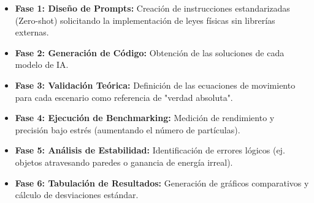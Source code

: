 \begin{itemize}
    \item \textbf{Fase 1: Diseño de Prompts:} Creación de instrucciones estandarizadas (Zero-shot) solicitando la implementación de leyes físicas sin librerías externas.
    \item \textbf{Fase 2: Generación de Código:} Obtención de las soluciones de cada modelo de IA.
    \item \textbf{Fase 3: Validación Teórica:} Definición de las ecuaciones de movimiento para cada escenario como referencia de "verdad absoluta".
    \item \textbf{Fase 4: Ejecución de Benchmarking:} Medición de rendimiento y precisión bajo estrés (aumentando el número de partículas).
    \item \textbf{Fase 5: Análisis de Estabilidad:} Identificación de errores lógicos (ej. objetos atravesando paredes o ganancia de energía irreal).
    \item \textbf{Fase 6: Tabulación de Resultados:} Generación de gráficos comparativos y cálculo de desviaciones estándar.
\end{itemize}

